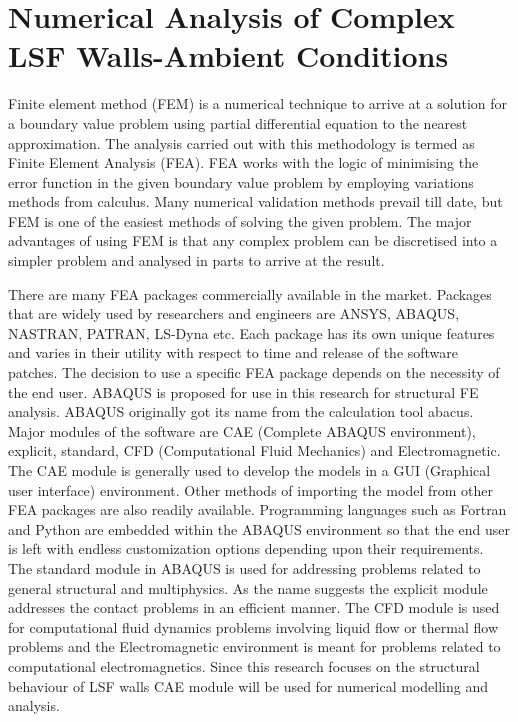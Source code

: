 \section{Numerical Analysis of Complex LSF Walls-Ambient Conditions}

Finite element method (FEM) is a numerical technique to arrive at a solution for a boundary value problem using partial differential equation to the nearest approximation. The analysis carried out with this methodology is termed as Finite Element Analysis (FEA). FEA works with the logic of minimising the error function in the given boundary value problem by employing variations methods from calculus. Many numerical validation methods prevail till date, but FEM is one of the easiest methods of solving the given problem. The major advantages of using FEM is that any complex problem can be discretised into a simpler problem and analysed in parts to arrive at the result. 

There are many FEA packages commercially available in the market. Packages that are widely used by researchers and engineers are ANSYS, ABAQUS, NASTRAN, PATRAN, LS-Dyna etc. Each package has its own unique features and varies in their utility with respect to time and release of the software patches. The decision to use a specific FEA package depends on the necessity of the end user. ABAQUS is proposed for use in this research for structural FE analysis. ABAQUS originally got its name from the calculation tool abacus. Major modules of the software are CAE (Complete ABAQUS environment), explicit, standard, CFD (Computational Fluid Mechanics) and Electromagnetic. The CAE module is generally used to develop the models in a GUI (Graphical user interface) environment. Other methods of importing the model from other FEA packages are also readily available. Programming languages such as Fortran and Python are embedded within the ABAQUS environment so that the end user is left with endless customization options depending upon their requirements. The standard module in ABAQUS is used for addressing problems related to general structural and multiphysics. As the name suggests the explicit module addresses the contact problems in an efficient manner. The CFD module is used for computational fluid dynamics problems involving liquid flow or thermal flow problems and the Electromagnetic environment is meant for problems related to computational electromagnetics. Since this research focuses on the structural behaviour of LSF walls CAE module will be used for numerical modelling and analysis.

